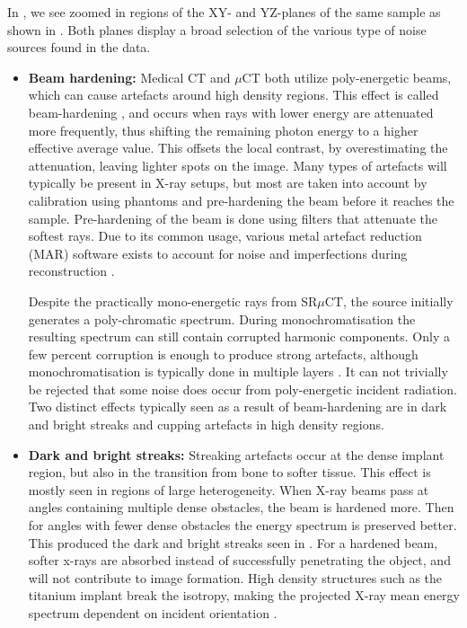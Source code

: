 \documentclass[pdflatex,sn-mathphys]{sn-jnl}%
\theoremstyle{thmstyleone}%
\theoremstyle{thmstyletwo}%
\theoremstyle{thmstylethree}%
\begin{document}
In , we see zoomed in regions of the XY- and YZ-planes of the same sample as shown
in .  Both planes display a broad selection of the various type of noise
sources found in the data.
\begin{itemize}
\item \textbf{Beam hardening:} Medical CT and $\mu$CT both utilize poly-energetic beams, which can cause artefacts around high
density regions. This effect is called beam-hardening \citep{beam-hardening}, and occurs when rays
with lower energy are attenuated more frequently, thus shifting the remaining photon energy to a
higher effective average value. This offsets the local contrast, by overestimating the attenuation,
leaving lighter spots on the image. Many types of artefacts will typically be present in X-ray 
setups, but most are taken into account by calibration using phantoms and pre-hardening the beam
before it reaches the sample. Pre-hardening of the beam is done using filters that attenuate the
softest rays. Due to its common usage, various metal artefact reduction (MAR) software exists to
account for noise and imperfections during reconstruction \citep{mar1}\citep{mar2}.

Despite the practically mono-energetic rays from SR$\mu$CT, the source initially generates a
poly-chromatic spectrum. During monochromatisation the resulting spectrum can still contain
corrupted harmonic components. Only a few percent corruption is enough to produce strong artefacts,
although monochromatisation is typically done in multiple layers \citep{srnoise}.  It can not
trivially be rejected that some noise does occur from poly-energetic incident radiation.  Two
distinct effects typically seen as a result of beam-hardening are in dark and bright streaks and
cupping artefacts in high density regions.

\item \textbf{Dark and bright streaks:} Streaking artefacts occur at the dense implant region, but also
in the transition from bone to softer tissue. This effect is mostly seen in regions of large
heterogeneity. When X-ray beams pass at angles containing multiple dense obstacles, the beam is
hardened more. Then for angles with fewer dense obstacles the energy spectrum is preserved better.
This produced the dark and bright streaks seen in .
%
For a hardened beam, softer x-rays are absorbed instead of successfully penetrating the object, and
will not contribute to image formation. High density structures such as the titanium implant break
the isotropy, making the projected X-ray mean energy spectrum dependent on incident orientation
\citep{srnoise}.


\end{itemize}
\end{document}
